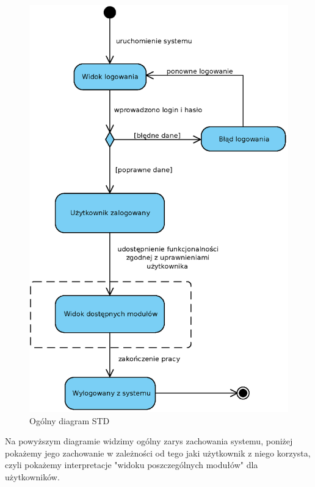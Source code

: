 
\begin{figure}[H]
		\centering
		\includegraphics[width=.8\textwidth]{img/AD/STDmain.eps}
		\caption{Ogólny diagram STD}
\end{figure}

Na powyższym diagramie widzimy ogólny zarys zachowania systemu, poniżej pokażemy jego zachowanie w zależności od tego jaki użytkownik z niego korzysta, czyli pokażemy interpretacje "widoku poszczególnych modułów" dla użytkowników.

